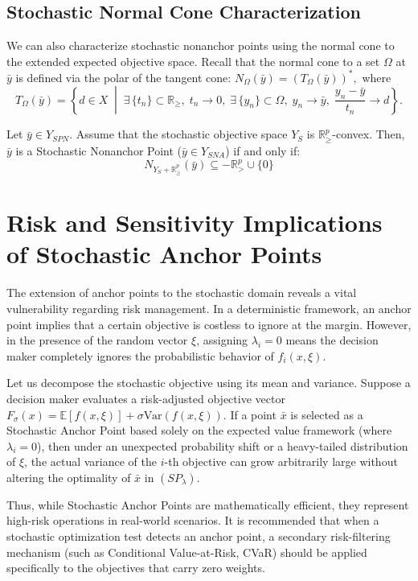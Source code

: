 \documentclass[twoside]{article}
\begin{document}
\subsection{Stochastic Normal Cone Characterization}
We can also characterize stochastic nonanchor points using the normal cone to the extended expected objective space. Recall that the normal cone to a set $\Omega$ at $\bar{y}$ is defined via the polar of the tangent cone: $N_\Omega(\bar{y}) = (T_\Omega(\bar{y}))^*,$ where
$$
T_{\Omega}(\bar{y}) = \left\{ d \in X \; \middle| \; 
\exists\, \{t_n\} \subset \mathbb{R}_{\geq},\; t_n \to 0,\;
\exists\, \{y_n\} \subset \Omega,\; y_n \to \bar{y},\;
\frac{y_n - \bar{y}}{t_n} \to d \right\}.
$$

\begin{thm}
	Let $\bar{y} \in Y_{SPN}$. Assume that the stochastic objective space $Y_S$ is $\mathbb{R}^p_{\ge}$-convex. Then, $\bar{y}$ is a Stochastic Nonanchor Point ($\bar{y} \in Y_{SNA}$) if and only if:
	\begin{equation}
	N_{Y_S + \mathbb{R}^p_{\ge}}(\bar{y}) \subseteq -\mathbb{R}^p_{>} \cup \{0\}
	\end{equation}
\end{thm}



\section{Risk and Sensitivity Implications of Stochastic Anchor Points}
The extension of anchor points to the stochastic domain reveals a vital vulnerability regarding risk management. In a deterministic framework, an anchor point implies that a certain objective is costless to ignore at the margin. However, in the presence of the random vector $\xi$, assigning $\lambda_i = 0$ means the decision maker completely ignores the probabilistic behavior of $f_i(x, \xi)$.

Let us decompose the stochastic objective using its mean and variance. Suppose a decision maker evaluates a risk-adjusted objective vector $F_\sigma(x) = \mathbb{E}[f(x, \xi)] + \sigma \text{Var}(f(x, \xi))$. If a point $\bar{x}$ is selected as a Stochastic Anchor Point based solely on the expected value framework (where $\lambda_i = 0$), then under an unexpected probability shift or a heavy-tailed distribution of $\xi$, the actual variance of the $i$-th objective can grow arbitrarily large without altering the optimality of $\bar{x}$ in $(SP_\lambda)$. 

Thus, while Stochastic Anchor Points are mathematically efficient, they represent high-risk operations in real-world scenarios. It is recommended that when a stochastic optimization test detects an anchor point, a secondary risk-filtering mechanism (such as Conditional Value-at-Risk, CVaR) should be applied specifically to the objectives that carry zero weights.
\end{document}
